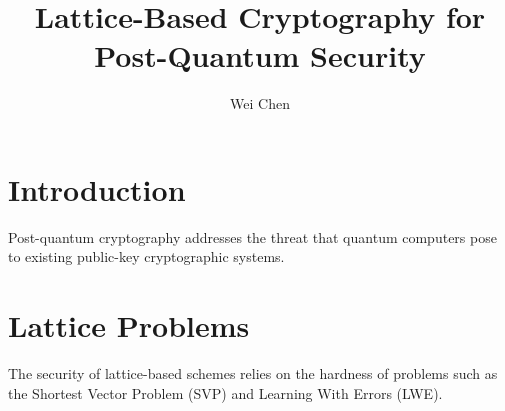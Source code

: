 \documentclass{article}
\title{Lattice-Based Cryptography for Post-Quantum Security}
\author{Wei Chen}
\begin{document}
\maketitle

\section{Introduction}
Post-quantum cryptography addresses the threat that quantum computers pose
to existing public-key cryptographic systems.

\section{Lattice Problems}
The security of lattice-based schemes relies on the hardness of problems
such as the Shortest Vector Problem (SVP) and Learning With Errors (LWE).
\end{document}
